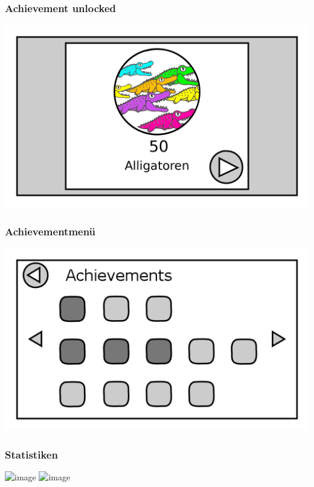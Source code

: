 \documentclass[t]{beamer}
\begin{document}
\begin{frame}
	\frametitle{Achievement unlocked}
	\includegraphics[width=\textwidth]{achievement_aligator.png}
\end{frame}
\begin{frame}
	\frametitle{Achievementmenü}
	\includegraphics[width=\textwidth]{achievements.png}
\end{frame}
\begin{frame}
	\frametitle{Statistiken}
	\includegraphics<1>[width=\textwidth]{stats_mod.png}
	\includegraphics<2>[width=\textwidth]{stats_fort.png}
\end{frame}
\end{document}
